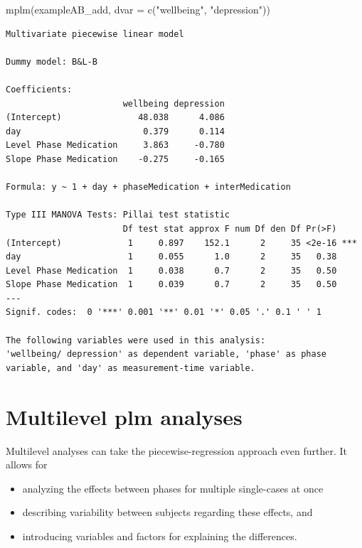 \documentclass[
]{book}
\newenvironment{Shaded}{\begin{snugshade}}{\end{snugshade}}
\newcommand{\AttributeTok}[1]{\textcolor[rgb]{0.77,0.63,0.00}{#1}}
\newcommand{\FunctionTok}[1]{\textcolor[rgb]{0.00,0.00,0.00}{#1}}
\newcommand{\NormalTok}[1]{#1}
\newcommand{\StringTok}[1]{\textcolor[rgb]{0.31,0.60,0.02}{#1}}
\providecommand{\tightlist}{%
  \setlength{\itemsep}{0pt}\setlength{\parskip}{0pt}}
\begin{document}
\begin{Shaded}
\begin{Highlighting}[]
\FunctionTok{mplm}\NormalTok{(exampleAB\_add, }\AttributeTok{dvar =} \FunctionTok{c}\NormalTok{(}\StringTok{"wellbeing"}\NormalTok{, }\StringTok{"depression"}\NormalTok{))}
\end{Highlighting}
\end{Shaded}

\begin{verbatim}
Multivariate piecewise linear model

Dummy model: B&L-B 

Coefficients: 
                       wellbeing depression
(Intercept)               48.038      4.086
day                        0.379      0.114
Level Phase Medication     3.863     -0.780
Slope Phase Medication    -0.275     -0.165

Formula: y ~ 1 + day + phaseMedication + interMedication

Type III MANOVA Tests: Pillai test statistic
                       Df test stat approx F num Df den Df Pr(>F)    
(Intercept)             1     0.897    152.1      2     35 <2e-16 ***
day                     1     0.055      1.0      2     35   0.38    
Level Phase Medication  1     0.038      0.7      2     35   0.50    
Slope Phase Medication  1     0.039      0.7      2     35   0.50    
---
Signif. codes:  0 '***' 0.001 '**' 0.01 '*' 0.05 '.' 0.1 ' ' 1

The following variables were used in this analysis:
'wellbeing/ depression' as dependent variable, 'phase' as phase variable, and 'day' as measurement-time variable.
\end{verbatim}

\hypertarget{multilevel-plm-analyses}{%
\section{Multilevel plm analyses}\label{multilevel-plm-analyses}}

Multilevel analyses can take the piecewise-regression approach even further. It allows for

\begin{itemize}
\tightlist
\item
  analyzing the effects between phases for multiple single-cases at once
\item
  describing variability between subjects regarding these effects, and
\item
  introducing variables and factors for explaining the differences.
\end{itemize}
\end{document}
